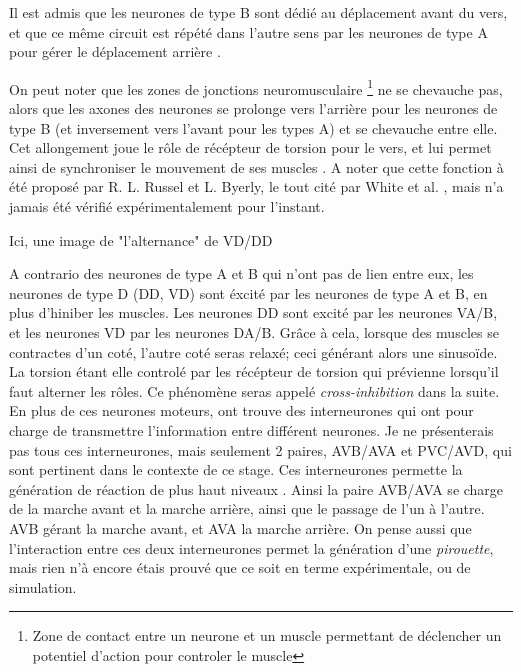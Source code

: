 Il est admis que les neurones de type B sont dédié au déplacement avant du vers,
et que ce même circuit est répété dans l'autre sens par les neurones de type A
pour gérer le déplacement arrière \cite{AltunZ.F.andHall2011,Boyle2009,White1986}.

On peut noter que les zones de jonctions neuromusculaire \footnote{Zone de
contact entre un neurone et un muscle permettant de déclencher un potentiel
d'action pour controler le muscle} ne se chevauche pas, alors que les axones
des neurones se prolonge vers l'arrière pour les neurones de type B (et
inversement vers l'avant pour les types A) et se chevauche entre elle. Cet
allongement joue le rôle de récépteur de torsion pour le vers, et lui permet
ainsi de synchroniser le mouvement de ses muscles \cite{Boyle2009}. A noter que
cette fonction à été proposé par R. L. Russel et L. Byerly, le tout cité par
White et al. \cite{White1986}, mais n'a jamais été vérifié expérimentalement
pour l'instant.


\begin{center}
   Ici, une image de "l'alternance" de VD/DD
\end{center}
A contrario des neurones de type A et B qui n'ont pas de lien entre eux, les
neurones de type D (DD, VD) sont éxcité par les neurones de type A et B, en
plus d'hiniber les muscles. Les neurones DD sont excité par les neurones VA/B,
et les neurones VD par les neurones DA/B. Grâce à cela, lorsque des muscles se
contractes d'un coté, l'autre coté seras relaxé; ceci générant alors une
sinusoïde. La torsion étant elle controlé par les récépteur de torsion qui
prévienne lorsqu'il faut alterner les rôles. Ce phénomène seras appelé
\textit{cross-inhibition} dans la suite.\\


En plus de ces neurones moteurs, ont trouve des interneurones qui ont pour
charge de transmettre l'information entre différent neurones. Je ne
présenterais pas tous ces interneurones, mais seulement 2 paires, AVB/AVA et
PVC/AVD, qui sont pertinent dans le contexte de ce stage.  Ces interneurones
permette la génération de réaction de plus haut niveaux
\cite{Boyle2009,White1986}.  Ainsi la paire AVB/AVA se charge de la marche
avant et la marche arrière, ainsi que le passage de l'un à l'autre. AVB gérant
la marche avant, et AVA la marche arrière. On pense aussi que l'interaction
entre ces deux interneurones permet la génération d'une \textit{pirouette},
mais rien n'à encore étais prouvé que ce soit en terme expérimentale, ou de
simulation.

